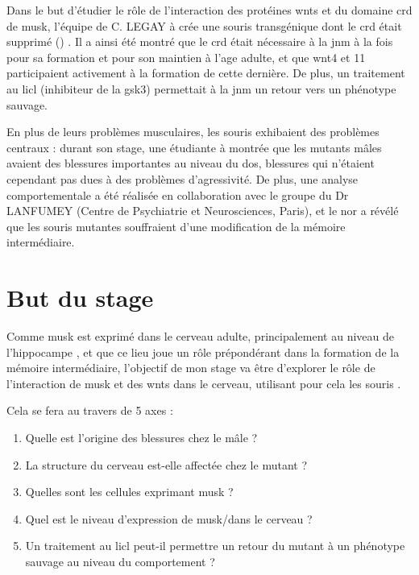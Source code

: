 	Dans le but d'étudier le rôle de l'interaction des protéines \Glspl{wnt} et du domaine \gls{crd} de \gls{musk}, l'équipe de C. LEGAY à crée une souris transgénique dont le \gls{crd} était supprimé (\mcrd) \cite{Messeant2015, Messeant2017}. Il a ainsi été montré que le \gls{crd} était nécessaire à la \gls{jnm} à la fois pour sa formation et pour son maintien à l'age adulte, et que \Gls{wnt}4 et 11 participaient activement à la formation de cette dernière. De plus, un traitement au \gls{licl} (inhibiteur de la \gls{gsk3}) permettait à la \gls{jnm} un retour vers un phénotype sauvage.
	
	En plus de leurs problèmes musculaires, les souris \mcrd exhibaient des problèmes centraux : durant son stage, une étudiante à montrée que les mutants mâles avaient des blessures importantes au niveau du dos, blessures qui n'étaient cependant pas dues à des problèmes d'agressivité. De plus, une analyse comportementale a été réalisée en collaboration avec le groupe du Dr LANFUMEY (Centre de Psychiatrie et Neurosciences, Paris), et le \gls{nor} a révélé que les souris mutantes souffraient d'une modification de la mémoire intermédiaire.
		
\section{But du stage}
\label{sec:IntroBut}

Comme \gls{musk} est exprimé dans le cerveau adulte, principalement au niveau de l'hippocampe \cite{Garcia-Osta2006}, et que ce lieu joue un rôle prépondérant dans la formation de la mémoire intermédiaire, l'objectif de mon stage va être d'explorer le rôle de l'interaction de \gls{musk} et des \Glspl{wnt} dans le cerveau, utilisant pour cela les souris \mcrd.

Cela se fera au travers de 5 axes : 
\begin{enumerate}
	\item Quelle est l'origine des blessures chez le mâle ?
	\item La structure du cerveau est-elle affectée chez le mutant ?
	\item Quelles sont les cellules exprimant \gls{musk} ?
	\item Quel est le niveau d'expression de \gls{musk}/\mcrd dans le cerveau ?
	\item Un traitement au \gls{licl} peut-il permettre un retour du mutant à un phénotype sauvage au niveau du comportement ?
\end{enumerate}